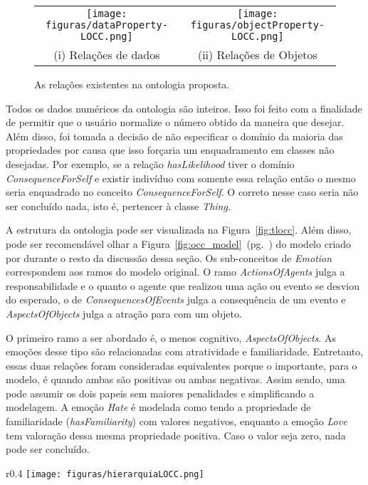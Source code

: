 \begin{figure}[b]
  \centering
  \begin{tabular}{cc}
  \texttt{[image: figuras/dataProperty-LOCC.png]} & \texttt{[image: figuras/objectProperty-LOCC.png]} \\
  (i) Relações de dados & (ii) Relações de Objetos
  \end{tabular}
  \caption{As relações existentes na ontologia proposta.}
  \label{fig:kplocc}
\end{figure}

Todos os dados numéricos da ontologia são inteiros. Isso foi feito com a
finalidade de permitir que o usuário normalize\dev{} o número obtido da
maneira que desejar. Além disso, foi tomada a decisão de não especificar o
domínio da maioria das propriedades por causa que isso forçaria um
enquadramento em classes não desejadas. Por exemplo, se a relação
\emph{hasLikelihood} tiver o domínio \emph{ConsequenceForSelf} e existir
indivíduo com somente essa relação então o mesmo seria enquadrado no conceito
\emph{ConsequenceForSelf}. O correto nesse caso seria não ser concluído nada,
isto é, pertencer à classe \emph{Thing}.

A estrutura da ontologia pode ser visualizada na Figura~\ref{fig:tlocc}. Além
disso, pode ser recomendável olhar a
Figura~\ref{fig:occ_model}~(pg.~\pageref{fig:occ_model}) do modelo criado por
\citet{ortony1988cse} durante o resto da discussão dessa seção. Os
sub-conceitos de \emph{Emotion} correspondem aos ramos do modelo original. O
ramo \emph{ActionsOfAgents} julga a responsabilidade e o quanto o agente que
realizou uma ação ou evento se desviou do esperado, o de
\emph{ConsequencesOfEvents} julga a consequência de um evento e
\emph{AspectsOfObjects} julga a atração para com um objeto.

O primeiro ramo a ser abordado é, o menos cognitivo, \emph{AspectsOfObjects}.
As emoções desse tipo são relacionadas com atratividade e familiaridade.
Entretanto, essas duas relações foram consideradas equivalentes porque o
importante, para o modelo, é quando ambas são positivas ou ambas negativas.
Assim sendo, uma pode assumir os dois papeis sem maiores penalidades e
simplificando a modelagem. A emoção \emph{Hate} é modelada como tendo a
propriedade de familiaridade (\emph{hasFamiliarity}) com valores negativos,
enquanto a emoção \emph{Love} tem valoração dessa mesma propriedade positiva.
Caso o valor seja zero, nada pode ser concluído.

\begin{wrapfigure}{r}{0.4\textwidth}
  \texttt{[image: figuras/hierarquiaLOCC.png]}
  \caption{Taxonomia da ontologia proposta baseado no modelo.}
  \label{fig:tlocc}
\end{wrapfigure}

